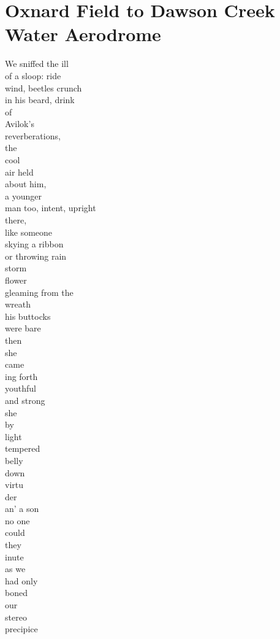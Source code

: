 \documentclass[smalldemyvopaper,11pt,twoside,onecolumn,openright,extrafontsizes]{memoir}
\begin{document}
\chapter{Oxnard Field to Dawson Creek Water Aerodrome}
We sniffed the ill
\\of a sloop: ride
\\wind, beetles crunch
\\in his beard, drink
\\of
\\Avilok's
\\reverberations,
\\the
\\cool
\\air held
\\about him,
\\a younger
\\man too, intent, upright
\\there,
\\like someone
\\skying a ribbon
\\or throwing rain
\\storm
\\flower
\\gleaming from the
\\wreath
\\his buttocks
\\were bare
\\then
\\she
\\came
\\ing forth
\\youthful
\\and strong
\\she
\\by
\\light
\\tempered
\\belly
\\down
\\virtu
\\der
\\an' a son
\\no one
\\could
\\they
\\inute
\\as we
\\had only
\\boned
\\our
\\stereo
\\precipice
\end{document}
